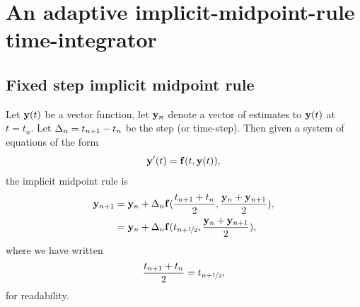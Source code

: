 


\newcommand{\thfx}[1]{t_{#1+\half}}
\newcommand{\thf}{\thfx{n}}

\newcommand{\yvhfx}[2]{\yv#1(\thfx{#2})}
\newcommand{\yvhf}[1][]{\yvhfx{#1}{n}}

\newcommand{\dfdy}{F}
\newcommand{\dfdyhfx}[1]{\dfdy_{#1+\half}}
\newcommand{\dfdyhf}{\dfdyhfx{n}}

\newcommand{\ymiderr}{a_n}

\newcommand{\imr}{IMR}



\section{An adaptive implicit-midpoint-rule time-integrator}





\subsection{Fixed step implicit midpoint rule}

Let $\mathbf{y}(t)$ be a vector function, let $\mathbf{y}_n$ denote a vector of estimates to $\mathbf{y}(t)$ at $t = t_n$.
Let $\Delta_{n} = t_{n+1} - t_n$ be the step (or time-step).
Then given a system of equations of the form
\begin{equation}
  \mathbf{y}'(t) = {\mathbf{f}}(t, \mathbf{y}(t)),
  \label{eq:43}
\end{equation}
the implicit midpoint rule is
\begin{align}
  \yv_{n+1} &= \yv_n + \dtn \fv(\frac{t_{n+1} + t_n}{2}, \frac{\yv_n + \yv_{n+1}}{2}), \notag\\
  &= \yv_n + \dtn \fv(\thf, \frac{\yv_n + \yv_{n+1}}{2}),
  \label{eq:basic-midpoint}
\end{align}
where we have written
\begin{equation}
  \frac{t_{n+1} + t_n}{2} = \thf,
\end{equation}
for readability.

